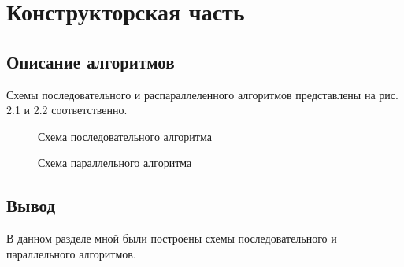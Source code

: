 \chapter{Конструкторская часть}

\section{Описание алгоритмов}

Схемы последовательного и распараллеленного алгоритмов представлены на рис. 2.1 и 2.2 соответственно.

\begin{figure}[!htbp]
	\centering
	
	\caption{Схема последовательного алгоритма}
\end{figure}
\FloatBarrier

\begin{figure}[!htbp]
	\centering
	
	\caption{Схема параллельного алгоритма}
\end{figure}
\FloatBarrier

\section*{Вывод}

В данном разделе мной были построены схемы последовательного и параллельного алгоритмов. %

\clearpage
